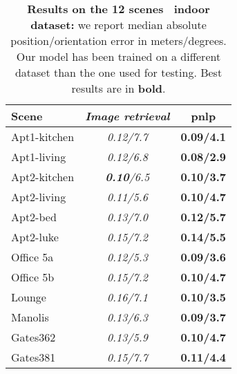 \begin{table}
\centering

\begin{minipage}{0.5\linewidth}

\centering
\begin{footnotesize}
\renewcommand{\arraystretch}{1.0}
\begin{tabular}{l | c c }
					Scene &	\textit{Image retrieval} & \ac{pnlp}  \\
	\hline
	\hline
 Apt1-kitchen 	& {\textit{0.12/7.7}} & {\textbf{0.09/4.1}}  \\
 Apt1-living 	& {\textit{0.12/6.8}} &  {\textbf{0.08/2.9}}\\
 Apt2-kitchen 	& {\textit{\textbf{0.10}/6.5}} & {\textbf{0.10/3.7}}   \\
 Apt2-living 	& {\textit{0.11/5.6}} & \textbf{0.10/4.7}  \\
 Apt2-bed 		& {\textit{0.13/7.0}} &  \textbf{0.12/5.7} \\
 Apt2-luke 	& {\textit{0.15/7.2}} & {\textbf{0.14/5.5}}  \\
 Office 5a	    & {\textit{0.12/5.3}} &  {\textbf{0.09/3.6}}  \\
 Office 5b 	& {\textit{0.15/7.2}} & {\textbf{0.10/4.7}} \\
 Lounge	 	& {\textit{0.16/7.1}} & {\textbf{0.10/3.5}}   \\
 Manolis	 	& {\textit{0.13/6.3}} & {\textbf{0.09/3.7}} \\
 Gates362	 	& {\textit{0.13/5.9}} & {\textbf{0.10/4.7}} \\
 Gates381 		& {\textit{0.15/7.7}} & {\textbf{0.11/4.4}} \\
 \hline
\end{tabular}
\end{footnotesize}

\end{minipage}\hfill
\begin{minipage}{0.45\linewidth}
\centering

\caption[Results on 12 scenes dataset]{\label{tab:12_scenes} \textbf{Results on the \textbf{12 scenes}~\citep{Valentin2016} indoor dataset:} we report median absolute position/orientation error in meters/degrees. Our model has been trained on a different dataset than the one used for testing. Best results are in \textbf{bold}.}

\end{minipage}

\end{table}